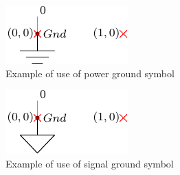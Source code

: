 \documentclass[a4paper,12pt]{article}
\begin{document}
\begin{figure}[h]
\centering
\includegraphics{gndPowerInfo}
\caption{Example of use of power ground symbol}
\label{gndPowerInfo} %
\end{figure}

\begin{figure}[h]
\centering
\includegraphics{gndSignalInfo}
\caption{Example of use of signal ground symbol}
\label{gndSignalInfo} %
\end{figure}
\end{document}
